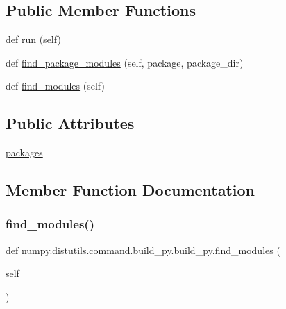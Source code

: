 \subsection*{Public Member Functions}
\begin{DoxyCompactItemize}
\item 
def \hyperlink{classnumpy_1_1distutils_1_1command_1_1build__py_1_1build__py_a2da830dbac9ddb42c7f260fa7807519e}{run} (self)
\item 
def \hyperlink{classnumpy_1_1distutils_1_1command_1_1build__py_1_1build__py_a40a4327630ee58d9ac098f87ed5ee5b4}{find\+\_\+package\+\_\+modules} (self, package, package\+\_\+dir)
\item 
def \hyperlink{classnumpy_1_1distutils_1_1command_1_1build__py_1_1build__py_af0538c201c2590ed4dc1fb48d0bb86ab}{find\+\_\+modules} (self)
\end{DoxyCompactItemize}
\subsection*{Public Attributes}
\begin{DoxyCompactItemize}
\item 
\hyperlink{classnumpy_1_1distutils_1_1command_1_1build__py_1_1build__py_a4a9354336b4b914325fd26760e4c9efd}{packages}
\end{DoxyCompactItemize}


\subsection{Member Function Documentation}
\mbox{\label{classnumpy_1_1distutils_1_1command_1_1build__py_1_1build__py_af0538c201c2590ed4dc1fb48d0bb86ab}} 
\subsubsection{\texorpdfstring{find\+\_\+modules()}{find\_modules()}}
{\footnotesize\ttfamily def numpy.\+distutils.\+command.\+build\+\_\+py.\+build\+\_\+py.\+find\+\_\+modules (\begin{DoxyParamCaption}\item[{}]{self }\end{DoxyParamCaption})}

